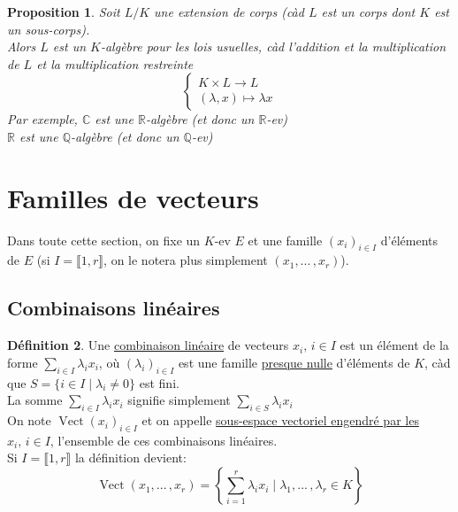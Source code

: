 \documentclass[10pt,a4paper]{article}
\theoremstyle{plain}
\newtheorem{proposition}{Proposition}[section]
\theoremstyle{definition}
\newtheorem{definition}[proposition]{Définition}
\DeclareMathOperator{\vect}{Vect}
\begin{document}
\begin{proposition}
Soit $L / K$ une extension de corps (càd  $L$ est un corps dont $K$ est un sous-corps). \\
Alors $L$ est un $K$-algèbre pour les lois usuelles, càd l'addition et la multiplication de $L$ et la multiplication restreinte
\[\begin{cases}
K \times L \to L \\
(\lambda, x) \mapsto \lambda x
\end{cases}\]
Par exemple, $\mathbb{C}$ est une $\mathbb{R}$-algèbre (et donc un $\mathbb{R}$-ev) \\
\phantom{Par exemple,} $\mathbb{R}$ est une $\mathbb{Q}$-algèbre (et donc un $\mathbb{Q}$-ev) 
\end{proposition}

\section{Familles de vecteurs}
Dans toute cette section, on fixe un $K$-ev $E$ et une famille $(x_i)_{i \in I}$ d'éléments de $E$ (si $I = \llbracket 1, r \rrbracket$, on le notera plus simplement $(x_1, ...\, , x_r)$).
\subsection{Combinaisons linéaires}
\begin{definition}
Une \uline{combinaison linéaire} de vecteurs $x_i,\, i\in I$ est un élément de la forme $\sum\limits_{i \in I} \lambda_i x_i$, où $(\lambda_i)_{i \in I}$ est une famille \uline{presque nulle} d'éléments de $K$, càd que $S = \{ i \in I \mid \lambda_i \neq 0\}$ est fini. \\
La somme $\sum\limits_{i \in I} \lambda_i x_i$ signifie simplement $\sum\limits_{i \in S} \lambda_i x_i$ \\
On note $\vect(x_i)_{i \in I}$ et on appelle \uline{sous-espace vectoriel engendré par les $x_i,\, i \in I$}, l'ensemble de ces combinaisons linéaires. \\
Si $I = \llbracket 1, r \rrbracket$ la définition devient:
\[\vect(x_1, ...\, , x_r) = \left\lbrace\sum_{i = 1}^r \lambda_i x_i \mid \lambda_1, ...\, , \lambda_r \in K \right\rbrace\]
\end{definition}
\end{document}
